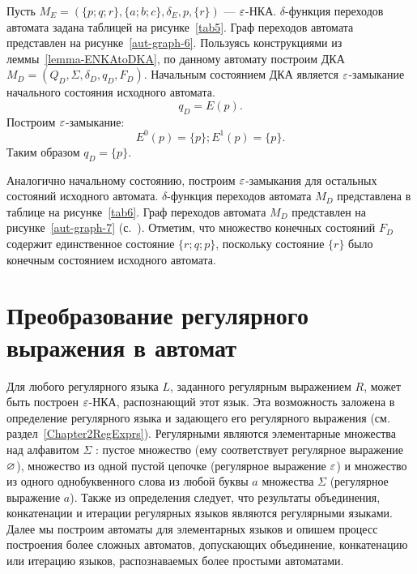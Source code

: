 \begin{myexample} \label{example-reduceENKAtoDKA} Пусть $M_E = (\{ p; 
q; r \},\{ a; b; c \}, \delta_E, p, \{ r \})$ --- $\varepsilon$-НКА. 
$\delta$-функция переходов автомата задана таблицей на рисунке~\ref{tab5}. Граф 
переходов автомата представлен на рисунке~\ref{aut-graph-6}. Пользуясь 
конструкциями из леммы~\ref{lemma-ENKAtoDKA}, по данному автомату 
построим ДКА $M_D = (Q_D, \Sigma, \delta_D, q_D, F_D)$. Начальным 
состоянием ДКА является $\varepsilon$-замыкание начального состояния исходного 
автомата. \[
	q_D = E(p).
\]
Построим $\varepsilon$-замыкание:
\[
	E^0(p) = \{ p \};
	E^1(p) = \{ p \}.
\]
Таким образом $q_D = \{ p \}$.



Аналогично начальному состоянию, построим $\varepsilon$-замыкания для 
остальных состояний исходного автомата. $\delta$-функция переходов 
автомата $M_D$ представлена в таблице на рисунке~\ref{tab6}. Граф 
переходов автомата $M_D$  представлен на рисунке~\ref{aut-graph-7} 
(с.~\pageref{aut-graph-7}). Отметим, что множество конечных состояний 
$F_D$ содержит единственное состояние $\{ r; q; p \}$, поскольку 
состояние $\{ r \}$ было конечным состоянием исходного автомата.
\end{myexample}



\section{Преобразование регулярного выражения в автомат} 
\label{Chapter4RegtoFA} 

Для любого регулярного языка $L$, заданного 
регулярным выражением $R$, может быть построен $\varepsilon$-НКА, распознающий 
этот язык. Эта возможность заложена в определение регулярного языка и 
задающего его регулярного выражения (см. 
раздел~\ref{Chapter2RegExprs}). Регулярными являются элементарные 
множества над алфавитом $\Sigma$ : пустое множество (ему соответствует 
регулярное выражение $\varnothing$), множество из одной пустой цепочке 
(регулярное выражение $\varepsilon$) и множество из одного однобуквенного 
слова из любой буквы $a$ множества $\Sigma$ (регулярное выражение $a$). 
Также из определения следует, что результаты объединения, конкатенации 
и итерации регулярных языков являются регулярными языками. Далее мы 
построим автоматы для элементарных языков и опишем процесс построения 
более сложных автоматов, допускающих объединение, конкатенацию или 
итерацию языков, распознаваемых более простыми автоматами.

